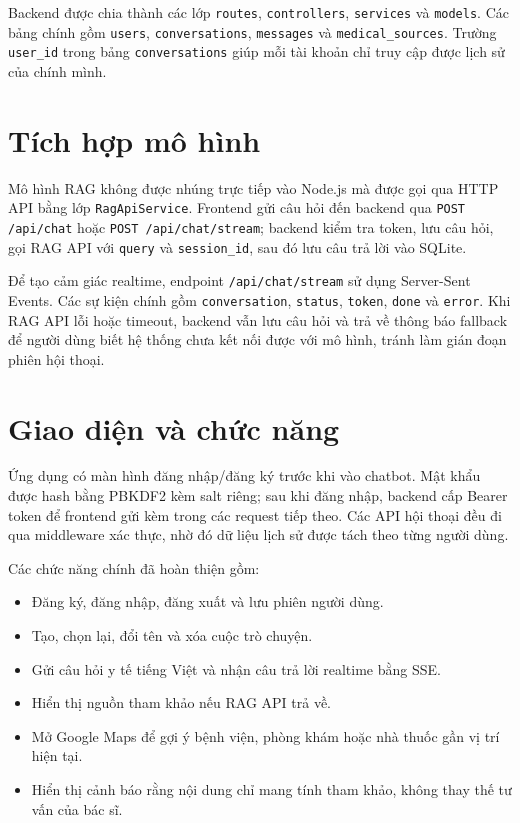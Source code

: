 \documentclass[12pt,a4paper,oneside]{report}
\begin{document}
Backend được chia thành các lớp \texttt{routes}, \texttt{controllers}, \texttt{services} và \texttt{models}. Các bảng chính gồm \texttt{users}, \texttt{conversations}, \texttt{messages} và \texttt{medical\_sources}. Trường \texttt{user\_id} trong bảng \texttt{conversations} giúp mỗi tài khoản chỉ truy cập được lịch sử của chính mình.

\section{Tích hợp mô hình}
Mô hình RAG không được nhúng trực tiếp vào Node.js mà được gọi qua HTTP API bằng lớp \texttt{RagApiService}. Frontend gửi câu hỏi đến backend qua \texttt{POST /api/chat} hoặc \texttt{POST /api/chat/stream}; backend kiểm tra token, lưu câu hỏi, gọi RAG API với \texttt{query} và \texttt{session\_id}, sau đó lưu câu trả lời vào SQLite.

Để tạo cảm giác realtime, endpoint \texttt{/api/chat/stream} sử dụng Server-Sent Events. Các sự kiện chính gồm \texttt{conversation}, \texttt{status}, \texttt{token}, \texttt{done} và \texttt{error}. Khi RAG API lỗi hoặc timeout, backend vẫn lưu câu hỏi và trả về thông báo fallback để người dùng biết hệ thống chưa kết nối được với mô hình, tránh làm gián đoạn phiên hội thoại.

\section{Giao diện và chức năng}
Ứng dụng có màn hình đăng nhập/đăng ký trước khi vào chatbot. Mật khẩu được hash bằng PBKDF2 kèm salt riêng; sau khi đăng nhập, backend cấp Bearer token để frontend gửi kèm trong các request tiếp theo. Các API hội thoại đều đi qua middleware xác thực, nhờ đó dữ liệu lịch sử được tách theo từng người dùng.

Các chức năng chính đã hoàn thiện gồm:
\begin{itemize}
    \item Đăng ký, đăng nhập, đăng xuất và lưu phiên người dùng.
    \item Tạo, chọn lại, đổi tên và xóa cuộc trò chuyện.
    \item Gửi câu hỏi y tế tiếng Việt và nhận câu trả lời realtime bằng SSE.
    \item Hiển thị nguồn tham khảo nếu RAG API trả về.
    \item Mở Google Maps để gợi ý bệnh viện, phòng khám hoặc nhà thuốc gần vị trí hiện tại.
    \item Hiển thị cảnh báo rằng nội dung chỉ mang tính tham khảo, không thay thế tư vấn của bác sĩ.
\end{itemize}
\end{document}
